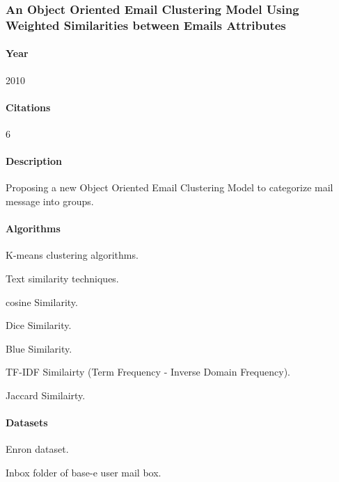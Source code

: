 \documentclass[12pt]{article}
\newenvironment{my_itemize}
{\begin{itemize}
  \setlength{\itemsep}{0cm}
  \setlength{\parskip}{0cm}}
{\end{itemize}}
\begin{document}
\subsubsection{An Object Oriented Email Clustering Model Using Weighted 
	      Similarities between Emails Attributes \cite{NARESH10}}
\paragraph{Year} 2010
\paragraph{Citations}6

\paragraph{Description}
\begin{my_itemize}
    \item Proposing a new Object Oriented Email Clustering Model to categorize 
	  mail message into groups.
\end{my_itemize}

\paragraph{Algorithms}
\begin{my_itemize}
    \item K-means clustering algorithms.
    \item Text similarity techniques.
    \begin{my_itemize}
        \item cosine Similarity.
        \item Dice Similarity.
        \item Blue Similarity.
        \item TF-IDF Similairty (Term Frequency - Inverse Domain Frequency).
        \item Jaccard Similairty.
    \end{my_itemize}
\end{my_itemize}

\paragraph{Datasets}
\begin{my_itemize}
    \item Enron dataset.
    \item Inbox folder of base-e user mail box.
\end{my_itemize}
\end{document}

